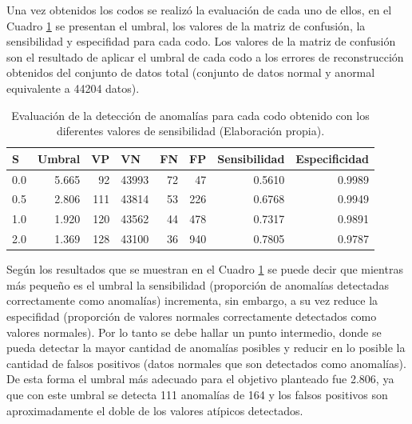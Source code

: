 Una vez obtenidos los codos se realiz\'{o} la evaluaci\'{o}n de cada uno de ellos, en el Cuadro \ref{table:evaluacion_codos} se presentan el umbral, los valores de la matriz de confusi\'{o}n, la sensibilidad y especifidad para cada codo. Los valores de la matriz de confusi\'{o}n son el resultado de aplicar el umbral de cada codo a los errores de reconstrucci\'{o}n obtenidos del conjunto de datos total (conjunto de datos normal y anormal equivalente a 44204 datos).

\begin{table}[H]
\centering
\begin{center}
\begin{tabular}{|l|r|r|r|r|r|r|r|}
\hline
\textbf{S} & \multicolumn{1}{l|}{\textbf{Umbral}} & \multicolumn{1}{l|}{\textbf{VP}} & \multicolumn{1}{l|}{\textbf{VN}}& \multicolumn{1}{l|}{\textbf{FN}}& \multicolumn{1}{l|}{\textbf{FP}} & \multicolumn{1}{l|}{\textbf{Sensibilidad}} & \multicolumn{1}{l|}{\textbf{Especificidad}} \\ \hline
0.0 & 5.665 & \cellcolor[HTML]{AADD99} 92 & \cellcolor[HTML]{AADD99} 43993 & \cellcolor[HTML]{FFCE93} 72 & \cellcolor[HTML]{FFCE93} 47 & 0.5610 & 0.9989 \\ \hline
0.5  & 2.806 & \cellcolor[HTML]{AADD99} 111 & \cellcolor[HTML]{AADD99} 43814 & \cellcolor[HTML]{FFCE93} 53 & \cellcolor[HTML]{FFCE93} 226 & 0.6768 & 0.9949 \\ \hline
1.0 &  1.920 & \cellcolor[HTML]{AADD99} 120 & \cellcolor[HTML]{AADD99} 43562 & \cellcolor[HTML]{FFCE93} 44 & \cellcolor[HTML]{FFCE93} 478 & 0.7317 & 0.9891 \\ \hline
2.0 & 1.369	 & \cellcolor[HTML]{AADD99} 128 & \cellcolor[HTML]{AADD99} 43100  & \cellcolor[HTML]{FFCE93} 36 & \cellcolor[HTML]{FFCE93} 940 & 0.7805 & 0.9787 \\ \hline
\end{tabular}
\end{center}
\caption{Evaluaci\'{o}n de la detecci\'{o}n de anomal\'{i}as para cada codo obtenido con los diferentes valores de sensibilidad (Elaboraci\'{o}n propia).}
\label{table:evaluacion_codos}
\end{table}

Seg\'{u}n los resultados que se muestran en el Cuadro \ref{table:evaluacion_codos} se puede decir que mientras m\'{a}s peque\~{n}o es el umbral la sensibilidad (proporci\'{o}n de anomal\'{i}as detectadas correctamente como anomal\'{i}as) incrementa, sin embargo, a su vez reduce la especifidad (proporci\'{o}n de valores normales correctamente detectados como valores normales). Por lo tanto se debe hallar un punto intermedio, donde se pueda detectar la mayor cantidad de anomal\'{i}as posibles y reducir en lo posible la cantidad de falsos positivos (datos normales que son detectados como anomal\'{i}as). De esta forma el umbral m\'{a}s adecuado para el objetivo planteado fue 2.806, ya que con este umbral se detecta 111 anomal\'{i}as de 164 y los falsos positivos son aproximadamente el doble de los valores at\'{i}picos detectados. 

